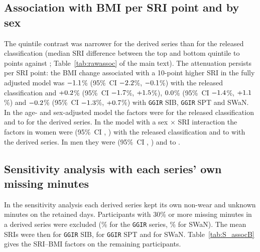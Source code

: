 \documentclass[12pt]{article}
\newcommand{\CI}[2]{(95\%\ CI #1, #2)}
\begin{document}
\subsection{Association with BMI per SRI point and by sex}
The quintile contrast was narrower for the derived series than for the released classification (median SRI difference between the top and bottom quintile \rawGgirSibMBDSri{} to \rawSwanMBDSri{} points against \rawPaxpredmMBDSri; Table~\ref{tab:rawassoc} of the main text). The attenuation persists per SRI point: the BMI change associated with a 10-point higher SRI in the fully adjusted model was $-1.1$\% \CI{$-2.2$\%}{$-0.1$\%} with the released classification and $+0.2$\% \CI{$-1.7$\%}{$+1.5$\%}, $0.0$\% \CI{$-1.4$\%}{$+1.1$\%} and $-0.2$\% \CI{$-1.3$\%}{$+0.7$\%} with \texttt{GGIR} SIB, \texttt{GGIR} SPT and SWaN. In the age- and sex-adjusted model the factors were \rawPaxpredmMAEst{} for the released classification and \rawSwanMAEst{} to \rawGgirSibMAEst{} for the derived series. In the model with a sex $\times$ SRI interaction the factors in women were \rawPaxpredmMCotherEst{} \CI{\rawPaxpredmMCotherLo}{\rawPaxpredmMCotherHi} with the released classification and \rawSwanMCotherEst{} to \rawGgirSptMCotherEst{} with the derived series. In men they were \rawPaxpredmMCrefEst{} \CI{\rawPaxpredmMCrefLo}{\rawPaxpredmMCrefHi} and \rawGgirSptMCrefEst{} to \rawGgirSibMCrefEst{}.

\subsection{Sensitivity analysis with each series' own missing minutes}
In the sensitivity analysis each derived series kept its own non-wear and unknown minutes on the retained days. Participants with 30\% or more missing minutes in a derived series were excluded (\rawGgirSibPctExclB\% for the \texttt{GGIR} series, \rawSwanPctExclB\% for SWaN). The mean SRIs were then \rawGgirSibSriBMean{} for \texttt{GGIR} SIB, \rawGgirSptSriBMean{} for \texttt{GGIR} SPT and \rawSwanSriBMean{} for SWaN. Table~\ref{tab:S_assocB} gives the SRI--BMI factors on the \rawModelNB{} remaining participants.
\end{document}
